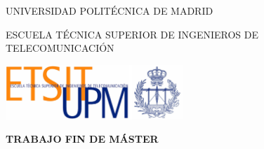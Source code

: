 
\begin{titlepage}
	\centering
	{\scshape\LARGE UNIVERSIDAD POLITÉCNICA DE MADRID \par}
	\vspace{0.5cm}
	{\scshape\Large ESCUELA TÉCNICA SUPERIOR DE INGENIEROS DE TELECOMUNICACIÓN \par}
	\vspace{0.5cm}	
	\includegraphics[width=0.5\textwidth]{./img/01_front/logoescuela.jpg}\par\vspace{1cm} %
	{\huge\bfseries TRABAJO FIN DE MÁSTER\par}
	\vspace{0.5cm}
	{\scshape\Large \myMaster \par}
	\vspace{1cm}
	{\huge\bfseries \myTitleEN \par}
	\vspace{1cm}
	{\Large\itshape \myFullname \par}
	\vfill
	{\large \currentYear \par}
\end{titlepage}


\afterpage{\blankpage}
\cleardoublepage